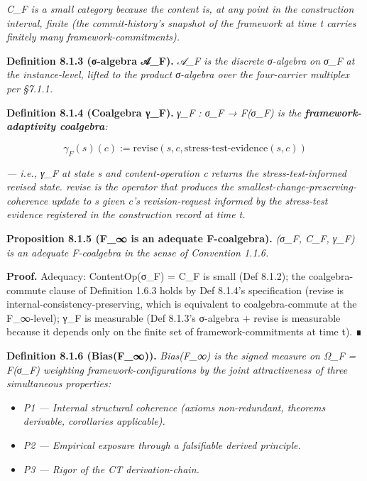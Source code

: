 \documentclass[11pt, openany]{book}
\begin{document}
\textit{C\_\allowbreak{}F is a small category because the content is, at any point in the construction interval, finite (the commit-history's snapshot of the framework at time t carries finitely many framework-commitments).}

\textbf{Definition 8.1.3 (σ-algebra 𝒜\_\allowbreak{}F).} \textit{𝒜\_\allowbreak{}F is the discrete σ-algebra on σ\_\allowbreak{}F at the instance-level, lifted to the product σ-algebra over the four-carrier multiplex per §7.1.1.}

\textbf{Definition 8.1.4 (Coalgebra γ\_\allowbreak{}F).} \textit{γ\_\allowbreak{}F : σ\_\allowbreak{}F → F(σ\_\allowbreak{}F) is the \textbf{framework-adaptivity coalgebra}:}

\[
\gamma_F(s)(c) := \mathrm{revise}(s, c, \mathrm{stress\text{-}test\text{-}evidence}(s, c))
\]

\textit{--- i.e., γ\_\allowbreak{}F at state s and content-operation c returns the stress-test-informed revised state. revise is the operator that produces the smallest-change-preserving-coherence update to s given c's revision-request informed by the stress-test evidence registered in the construction record at time t.}

\textbf{Proposition 8.1.5 (F\_\allowbreak{}∞ is an adequate F-coalgebra).} \textit{(σ\_\allowbreak{}F, C\_\allowbreak{}F, γ\_\allowbreak{}F) is an adequate F-coalgebra in the sense of Convention 1.1.6.}

\textbf{Proof.} Adequacy: ContentOp(σ\_\allowbreak{}F) = C\_\allowbreak{}F is small (Def 8.1.2); the coalgebra-commute clause of Definition 1.6.3 holds by Def 8.1.4's specification (revise is internal-consistency-preserving, which is equivalent to coalgebra-commute at the F\_\allowbreak{}∞-level); γ\_\allowbreak{}F is measurable (Def 8.1.3's σ-algebra + revise is measurable because it depends only on the finite set of framework-commitments at time t). ∎

\textbf{Definition 8.1.6 (Bias(F\_\allowbreak{}∞)).} \textit{Bias(F\_\allowbreak{}∞) is the signed measure on Ω\_\allowbreak{}F = F(σ\_\allowbreak{}F) weighting framework-configurations by the joint attractiveness of three simultaneous properties:}

\begin{itemize}
\item \textit{P1 --- Internal structural coherence (axioms non-redundant, theorems derivable, corollaries applicable).}
\item \textit{P2 --- Empirical exposure through a falsifiable derived principle.}
\item \textit{P3 --- Rigor of the CT derivation-chain.}
\end{itemize}
\end{document}
